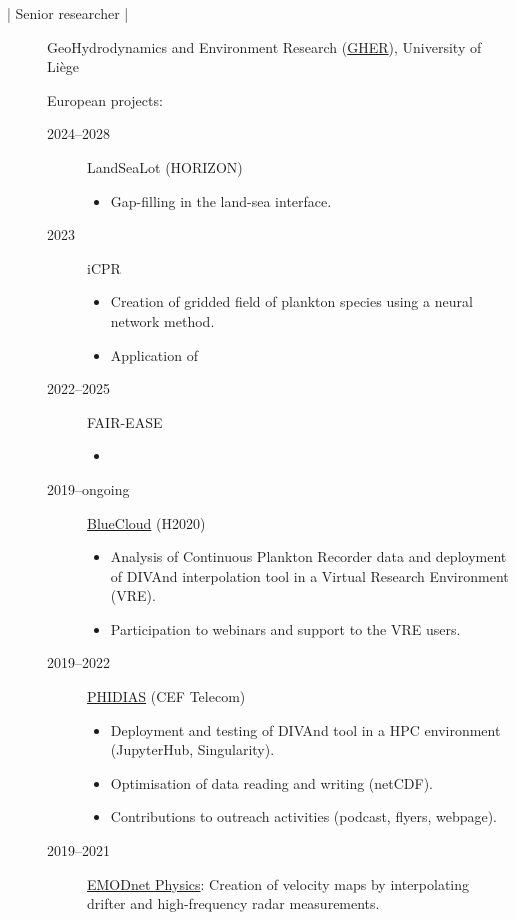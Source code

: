 \documentclass[10pt,a4paper,svgnames]{article}
\begin{document}
\begin{description}
\item[ | Senior researcher |] GeoHydrodynamics and Environment Research (\href{http://modb.oce.ulg.ac.be/}{GHER}), University of Liège

European projects:
\begin{description}

\item[2024--2028] LandSeaLot (HORIZON)
\begin{itemize}
\item Gap-filling in the land-sea interface.
\end{itemize}

\item[2023] iCPR
\begin{itemize}
\item Creation of gridded field of plankton species using a neural network method.
\item Application of 
\end{itemize}

\item[2022--2025] FAIR-EASE
\begin{itemize}
\item 
\end{itemize}

\item[2019--ongoing] \href{https://www.blue-cloud.org}{BlueCloud} (H2020)
\begin{itemize}
\item Analysis of Continuous Plankton Recorder data and deployment of \mbox{DIVAnd} interpolation tool in a Virtual Research Environment (VRE).
\item Participation to webinars and support to the VRE users.
\end{itemize}

\item[2019--2022] \href{https://www.phidias-hpc.eu/}{PHIDIAS} (CEF Telecom)
\begin{itemize}
\item Deployment and testing of DIVAnd tool in a HPC environment (JupyterHub, Singularity).
\item Optimisation of data reading and writing (netCDF).
\item Contributions to outreach activities (podcast, flyers, webpage).
\end{itemize}

\item[2019--2021] \href{https://www.emodnet-physics.eu}{EMODnet Physics}: Creation of velocity maps by interpolating drifter and high-frequency radar measurements. 


\end{description}
\end{description}
\end{document}
